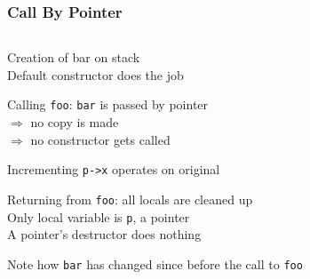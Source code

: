 \begin{frame}
  \frametitle{Call By Pointer}
  \begin{center}
    \begin{columns}
      \column{6cm}
      \column{6cm}
    \end{columns}
  \end{center}
  \vskip2mm
  \begin{overprint}
    \begin{center}
      Creation of bar on stack \\
      Default constructor does the job
    \end{center}

    \begin{center}
      Calling {\tt foo}: {\tt bar} is passed by pointer \\
      $\Rightarrow$ no copy is made \\
      $\Rightarrow$ no constructor gets called
    \end{center}

    \begin{center}
      Incrementing {\tt p->x} operates on original
    \end{center}

    \begin{center}
      Returning from {\tt foo}: all locals are cleaned up \\
      Only local variable is {\tt p}, a pointer \\
      A pointer's destructor does nothing
    \end{center}

    \begin{center}
      Note how {\tt bar} has changed since before the call to {\tt foo}
    \end{center}
  \end{overprint}
\end{frame}



